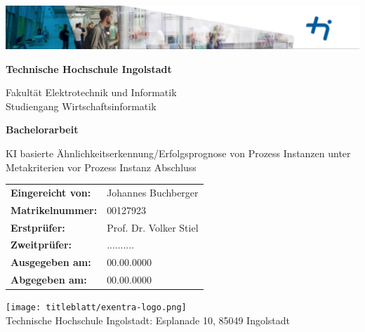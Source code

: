 \begin{titlepage}
    \flushright
    
    \includegraphics[width=1\textwidth]{thi-logo-head.png}
    
    \begin{center}
        \vspace*{1cm}
                
        \huge
        \textbf{Technische Hochschule Ingolstadt}
        
        \normalsize
        Fakultät Elektrotechnik und Informatik\\
        Studiengang Wirtschaftsinformatik
        
        \vspace{0.5cm}       
        \huge
        \textbf{Bachelorarbeit}

        \vspace{0.2cm}
        \normalsize
        KI basierte Ähnlichkeitserkennung/Erfolgsprognose von Prozess Instanzen unter Metakriterien vor Prozess Instanz Abschluss 
        
        \vspace{2cm}
        
        \begin{table}[h]
            \centering %
            \begin{tabular}{ll}
                \textbf{Eingereicht von:} & Johannes Buchberger \\
                \textbf{Matrikelnummer:} & 00127923 \\
                \textbf{Erstprüfer:} & Prof. Dr. Volker Stiel \\
                \textbf{Zweitprüfer:} & .......... \\
                \textbf{Ausgegeben am:} & 00.00.0000 \\
                \textbf{Abgegeben am:} & 00.00.0000
            \end{tabular}
        \end{table}

        \vspace{2cm}
        \texttt{[image: titleblatt/exentra-logo.png]}
        \\
        \large 
        Technische Hochschule Ingolstadt: Esplanade 10, 85049 Ingolstadt
    \end{center}
\end{titlepage}


